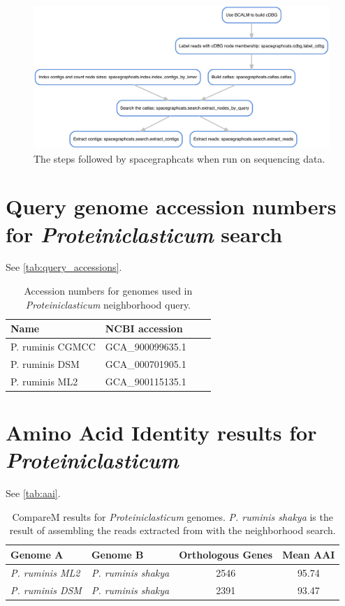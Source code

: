 \begin{figure}
 \centering
 \includegraphics[width=\linewidth]{sgc_dag}
	\caption{The steps followed by \textsf{spacegraphcats} when run
on sequencing data.
}
 \label{fig:sgc_dag}
\end{figure}

\section{Query genome accession numbers for {\em Proteiniclasticum} search}
\label{subsec:query_accessions}

See \autoref{tab:query_accessions}.

\begin{table}[b]
  \begin{tabular}{l l c c }
    \toprule
    Name & NCBI accession \\
    \midrule
    \hline
    P. ruminis CGMCC & GCA\_900099635.1 \\
    P. ruminis DSM & GCA\_000701905.1 \\
    P. ruminis ML2 & GCA\_900115135.1 \\
    \hline
    \bottomrule
  \end{tabular}
  \caption{Accession numbers for genomes used in {\em Proteiniclasticum} neighborhood query.}
  \label{tab:query_accessions}
\end{table}

\section{Amino Acid Identity results for {\em Proteiniclasticum}}
\label{subsec:aai}

See \autoref{tab:aai}.

\begin{table}
  \begin{tabular}{l l c c }
    \toprule
    Genome A & Genome B & Orthologous Genes & Mean AAI \\
    \midrule
    {\em P. ruminis ML2} & {\em P. ruminis shakya} & 2546 & 95.74 \\
    {\em P. ruminis DSM} & {\em P. ruminis shakya}  & 2391 & 93.47 \\
    \hline
    \bottomrule
  \end{tabular}
  \caption{CompareM results for {\em Proteiniclasticum} genomes. {\em P. ruminis shakya} is the result of assembling the reads extracted from \podarv with the neighborhood search.}
  \label{tab:aai}
\end{table}


